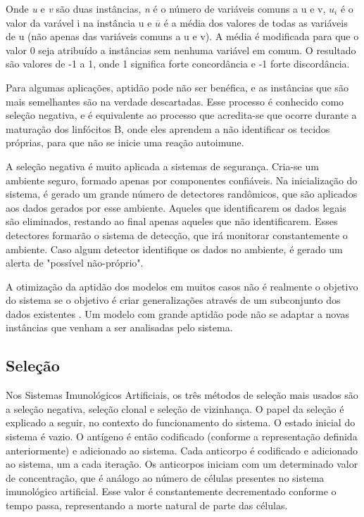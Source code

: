 Onde \emph{u} e \emph{v} são duas instâncias, \emph{n} é o número de variáveis comuns a u e v, \emph{$u_i$} é o valor da varável i na instância u e \emph{$\overline{u}$} é a média dos valores de todas as variáveis de u (não apenas das variáveis comuns a u e v). A média é modificada para que o valor 0 seja atribuído a instâncias sem nenhuma variável em comum. O resultado são valores de -1 a 1, onde 1 significa forte concordância e -1 forte discordância.

Para algumas aplicações, aptidão pode não ser benéfica, e as instâncias que são mais semelhantes são na verdade descartadas. Esse processo é conhecido como seleção negativa, e é equivalente ao processo que acredita-se que ocorre durante a maturação dos linfócitos B, onde eles aprendem a não identificar os tecidos próprias, para que não se inicie uma reação autoimune.

A seleção negativa é muito aplicada a sistemas de segurança. Cria-se um ambiente seguro, formado apenas por componentes confiáveis. Na inicialização do sistema, é gerado um grande número de detectores randômicos, que são aplicados aos dados gerados por esse ambiente. Aqueles que identificarem os dados legais são eliminados, restando ao final apenas aqueles que não identificarem. Esses detectores formarão o sistema de detecção, que irá monitorar constantemente o ambiente. Caso algum detector identifique os dados no ambiente, é gerado um alerta de "possível não-próprio".

A otimização da aptidão dos modelos em muitos casos não é realmente o objetivo do sistema se o objetivo é criar generalizações através de um subconjunto dos dados existentes \cite{Hand2001}. Um modelo com grande aptidão pode não se adaptar a novas instâncias que venham a ser analisadas pelo sistema.

\subsection{Seleção}

Nos Sistemas Imunológicos Artificiais, os três métodos de seleção mais usados são a seleção negativa, seleção clonal e seleção de vizinhança. O papel da seleção é explicado a seguir, no contexto do funcionamento do sistema. O estado inicial do sistema é vazio. O antígeno é então codificado (conforme a representação definida anteriormente) e adicionado ao sistema. Cada anticorpo é codificado e adicionado ao sistema, um a cada iteração. Os anticorpos iniciam com um determinado valor de concentração, que é análogo ao número de células presentes no sistema imunológico artificial. Esse valor é constantemente decrementado conforme o tempo passa, representando a morte natural de parte das células.

